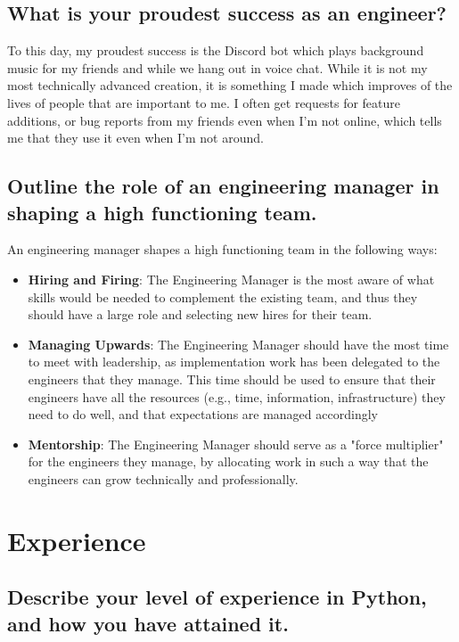 \documentclass{article}
\begin{document}
\subsection{What is your proudest success as an engineer?}

To this day, my proudest success is the Discord bot which plays background music
for my friends and while we hang out in voice chat. While it is not my most
technically advanced creation, it is something I made which improves of the
lives of people that are important to me. I often get requests for
feature additions, or bug reports from my friends even when I'm not online,
which tells me that they use it even when I'm not around.

\subsection{Outline the role of an engineering manager in shaping a high
  functioning team.}

An engineering manager shapes a high functioning team in the following ways:
\begin{itemize}
  \item \textbf{Hiring and Firing}: The Engineering Manager is the most aware
        of what skills would be needed to complement the existing team, and thus
        they should have a large role and selecting new hires for their team.
  \item \textbf{Managing Upwards}: The Engineering Manager should have the
        most time to meet with leadership, as implementation work has been delegated
        to the engineers that they manage. This time should be used to ensure that their
        engineers have all the resources (e.g., time, information, infrastructure) they
        need to do well, and that expectations are managed accordingly
  \item \textbf{Mentorship}: The Engineering Manager should serve as a "force
        multiplier" for the engineers they manage, by allocating work in such a way
        that the engineers can grow technically and professionally.
\end{itemize}

\section{Experience} \subsection{Describe your level of experience in Python,
  and how you have attained it.}
\end{document}
